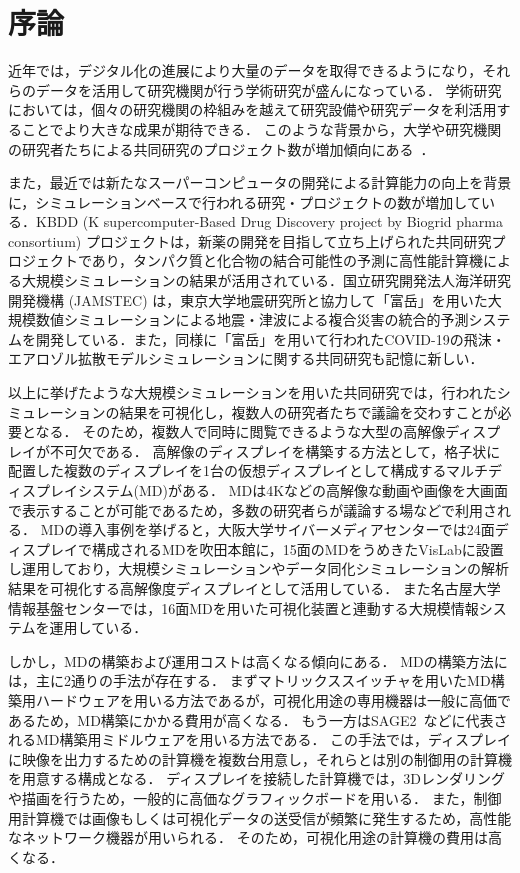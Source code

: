 \chapter{序論}

近年では，デジタル化の進展により大量のデータを取得できるようになり，それらのデータを活用して研究機関が行う学術研究が盛んになっている．
学術研究においては，個々の研究機関の枠組みを越えて研究設備や研究データを利活用することでより大きな成果が期待できる．
このような背景から，大学や研究機関の研究者たちによる共同研究のプロジェクト数が増加傾向にある~\cite{nisted}．

また，最近では新たなスーパーコンピュータの開発による計算能力の向上を背景に，シミュレーションベースで行われる研究・プロジェクトの数が増加している．KBDD (K supercomputer-Based Drug Discovery project by Biogrid pharma consortium) プロジェクト\cite{kbdd,kbddproject}は，新薬の開発を目指して立ち上げられた共同研究プロジェクトであり，タンパク質と化合物の結合可能性の予測に高性能計算機による大規模シミュレーションの結果が活用されている．国立研究開発法人海洋研究開発機構 (JAMSTEC) は，東京大学地震研究所と協力して「富岳」を用いた大規模数値シミュレーションによる地震・津波による複合災害の統合的予測システムを開発している．また，同様に「富岳」を用いて行われたCOVID-19の飛沫・エアロゾル拡散モデルシミュレーションに関する共同研究も記憶に新しい．

以上に挙げたような大規模シミュレーションを用いた共同研究では，行われたシミュレーションの結果を可視化し，複数人の研究者たちで議論を交わすことが必要となる．
そのため，複数人で同時に閲覧できるような大型の高解像ディスプレイが不可欠である．
高解像のディスプレイを構築する方法として，格子状に配置した複数のディスプレイを1台の仮想ディスプレイとして構成するマルチディスプレイシステム(MD)がある．
MDは4Kなどの高解像な動画や画像を大画面で表示することが可能であるため，多数の研究者らが議論する場などで利用される．
MDの導入事例を挙げると，大阪大学サイバーメディアセンターでは24面ディスプレイで構成されるMDを吹田本館に，15面のMDをうめきたVisLabに設置し運用しており，大規模シミュレーションやデータ同化シミュレーションの解析結果を可視化する高解像度ディスプレイとして活用している\cite{ciber_media}．
また名古屋大学情報基盤センターでは，16面MDを用いた可視化装置と連動する大規模情報システムを運用している\cite{nagoya}．

しかし，MDの構築および運用コストは高くなる傾向にある．
MDの構築方法には，主に2通りの手法が存在する．
まずマトリックススイッチャを用いたMD構築用ハードウェアを用いる方法であるが，可視化用途の専用機器は一般に高価であるため，MD構築にかかる費用が高くなる．
もう一方はSAGE2~\cite{sage2}などに代表されるMD構築用ミドルウェアを用いる方法である．
この手法では，ディスプレイに映像を出力するための計算機を複数台用意し，それらとは別の制御用の計算機を用意する構成となる．
ディスプレイを接続した計算機では，3Dレンダリングや描画を行うため，一般的に高価なグラフィックボードを用いる．
また，制御用計算機では画像もしくは可視化データの送受信が頻繁に発生するため，高性能なネットワーク機器が用いられる．
そのため，可視化用途の計算機の費用は高くなる．


